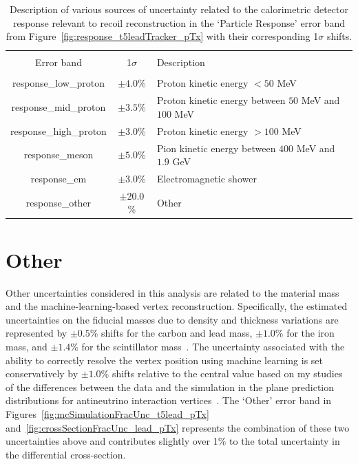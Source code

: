 \begin{table}[b!]
    \centering
    \small
    \begin{tabularx}{0.94\textwidth}{c c L}
    \hline \\ [-1.5 ex]
    Error band & 1$\sigma$ & Description\\ [0.5ex] %
    \hline
    \hline \\ [-2.0ex]
    response\_low\_proton & $\pm4.0$\% & Proton kinetic energy $< 50$ MeV \\
    response\_mid\_proton & $\pm3.5$\%  & Proton kinetic energy between $50$ MeV and $100$ MeV\\
    response\_high\_proton & $\pm3.0$\%  & Proton kinetic energy $> 100$ MeV  \\
    response\_meson & $\pm5.0$\%  & Pion kinetic energy between $400$ MeV and $1.9$ GeV \\
    response\_em & $ \pm3.0$\%  & Electromagnetic shower  \\
    response\_other & $\pm20.0$\%  &  Other \\
    \hline
    \end{tabularx}
    \caption{Description of various sources of uncertainty related to the calorimetric detector response relevant to recoil reconstruction in the `Particle Response' error band from Figure~\ref{fig:response_t5leadTracker_pTx} with their corresponding 1$\sigma$ shifts.}
    \label{table:responseUnc}
\end{table}

\section{Other}

Other uncertainties considered in this analysis are related to the material mass and the machine-learning-based vertex reconstruction. Specifically, the estimated uncertainties on the fiducial masses due to density and thickness variations are represented by $\pm0.5$\% shifts for the carbon and lead mass, $\pm1.0$\% for the iron mass, and $\pm1.4$\% for the scintillator mass~\cite{Aliaga_2014}. The uncertainty associated with the ability to correctly resolve the vertex position using machine learning is set conservatively by $\pm1.0$\% shifts relative to the central value based on my studies of the differences between the data and the simulation in the plane prediction distributions for antineutrino interaction vertices~\cite{Klustova_MLsys}. The `Other' error band in Figures~\ref{fig:mcSimulationFracUnc_t5lead_pTx} and~\ref{fig:crossSectionFracUnc_lead_pTx} represents the combination of these two uncertainties above and contributes slightly over 1\% to the total uncertainty in the differential cross-section. 

